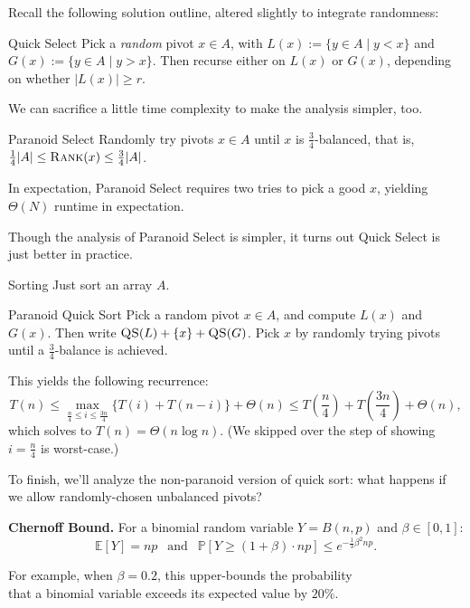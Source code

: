 Recall the following solution outline, altered slightly to integrate randomness:

\begin{solution}{Quick Select}
    Pick a \emph{random} pivot $x \in A$, with $L(x) := \{ y \in A \mid y < x\}$ and $G(x) := \{ y \in A \mid y > x \}$.  Then recurse either on $L(x)$ or $G(x)$, depending on whether $|L(x)| \geq r$.
\end{solution}

We can sacrifice a little time complexity to make the analysis simpler, too.

\begin{solution}{Paranoid Select}
    Randomly try pivots $x \in A$ until $x$ is $\frac{3}{4}$-balanced, that is, $\frac{1}{4}|A| \leq \textsc{Rank}(x) \leq \frac{3}{4}|A|$.
\end{solution}

In expectation, Paranoid Select requires two tries to pick a good $x$, yielding $\Theta(N)$ runtime in expectation.

\begin{remark}
    Though the analysis of Paranoid Select is simpler, it turns out Quick Select is just better in practice.
\end{remark}

\begin{problem}{Sorting}
    Just sort an array $A$.
\end{problem}

\begin{solution}{Paranoid Quick Sort}
    Pick a random pivot $x \in A$, and compute $L(x)$ and $G(x)$.  Then write $\textsc{QS}(L) + \{x\} + \textsc{QS}(G)$.  Pick $x$ by randomly trying pivots until a $\frac{3}{4}$-balance is achieved.
\end{solution}

This yields the following recurrence:
\[ T(n) \leq \max_{\frac{n}{4} \leq i \leq \frac{3n}{4}} \{ T(i) + T(n - i) \} + \Theta(n) \leq T\left(\dfrac{n}{4}\right) + T\left(\dfrac{3n}{4}\right) + \Theta(n), \]
which solves to $T(n) = \Theta(n \log n)$.  (We skipped over the step of showing $i = \frac{n}{4}$ is worst-case.)

To finish, we'll analyze the non-paranoid version of quick sort: what happens if we allow randomly-chosen unbalanced pivots?

\begin{boxed-text}[34em]
    \textbf{Chernoff Bound.} For a binomial random variable $Y = B(n, p)$ and $\beta \in [0, 1]$: \vspace{-0.3cm}
    \[ \mathbb{E}[Y] = np ~~ \text{ and } ~~ \mathbb{P}[Y \geq (1 + \beta) \cdot np] \leq e^{-\frac{1}{3} \beta^2  np}. \] \vspace{-0.8cm}
    
    For example, when $\beta = 0.2$, this upper-bounds the probability \\ that a binomial variable exceeds its expected value by $20\%$.
\end{boxed-text}

